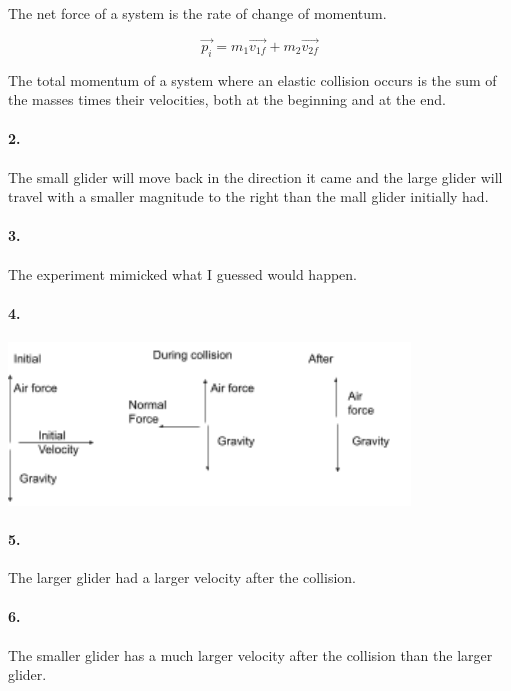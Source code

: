     The net force of a system is the rate of change of momentum.

    \begin{equation}
        \vec{p_{i}} = m_{1}\vec{v_{1f}} + m_{2}\vec{v_{2f}}
    \end{equation}

    The total momentum of a system where an elastic collision occurs is the sum of the masses times their velocities, both at the beginning and at the end.

    \paragraph*{2.}
    The small glider will move back in the direction it came and the large glider will travel with a smaller magnitude to the right than the mall glider initially had.

    \paragraph*{3.}
    The experiment mimicked what I guessed would happen.

    \paragraph*{4.}\mbox{}

    \includegraphics[width=0.8\textwidth]{image5.png}

    \paragraph*{5.}

    The larger glider had a larger velocity after the collision.

    \paragraph*{6.}

    The smaller glider has a much larger velocity after the collision than the larger glider.

